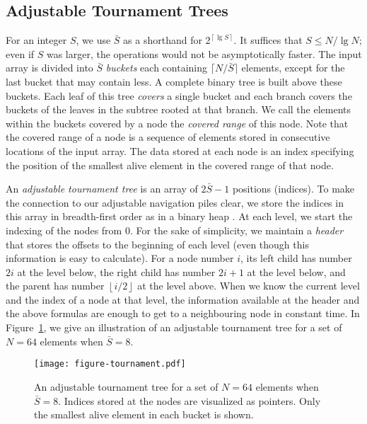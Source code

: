 \documentclass[final,onetabnum,onefignum,onethmnum]{siamltex}
\newcommand{\floors}[1]{\left\lfloor #1 \right\rfloor}
\newcommand{\ceils}[1]{\left\lceil #1 \right\rceil}
\begin{document}
\subsection{Adjustable Tournament Trees} 
For an integer $S$, we use $\bar{S}$ as a
shorthand for $2^{\ceils{\lg S}}$. It suffices that $S \leq N/\lg N$; even if $S$ was larger, the
operations would not be asymptotically faster. The input array is
divided into $\bar{S}$ \emph{buckets} 
each containing $\lceil N/\bar{S} \rceil$ elements, except for the last bucket that may contain less.
A complete binary tree is built above these buckets. Each leaf of
this tree
\emph{covers} a single bucket and each branch covers the
buckets of the leaves in the subtree rooted at that branch. We
call the elements within the buckets covered by a node the
\emph{covered range} of this node. Note that the covered range of a
node is a sequence of elements stored in consecutive locations of the
input array. The data stored at each node is an
index specifying the position of the smallest alive element in the
covered range of that node.
 
An \emph{adjustable tournament tree} is an array of $2 \bar{S} - 1$ positions (indices). 
To make the connection to our adjustable navigation piles clear, 
we store the indices in this array in breadth-first order as in a binary heap \cite{Wil64}. 
At each level, we start the indexing of the nodes  from
0. For the sake of simplicity, we maintain a \emph{header} that stores
the offsets to the beginning of each level (even though this
information is easy to calculate). For a node number $i$, its
left child has number $2i$ at the level below, the right child has number $2i +1$ at the level below, 
and the parent has number $\floors{i/2}$ at the level above. When we know the current level and the index
of a node at that level, the information available at the header and the above formulas
are enough to get to a neighbouring node in constant time. In
Figure~\ref{fig:tournament}, we give an illustration of an adjustable tournament tree
for a set of $N=64$ elements when $\bar{S} = 8$.

\begin{figure}[tb!]
\begin{center}
\texttt{[image: figure-tournament.pdf]}
\end{center}

\caption{An adjustable tournament tree for a set of $N= 64$ elements
  when $\bar{S} = 8$. Indices stored at the nodes are visualized as
  pointers. Only the smallest alive element in each bucket is shown.}
\label{fig:tournament}
\end{figure}
\end{document}
